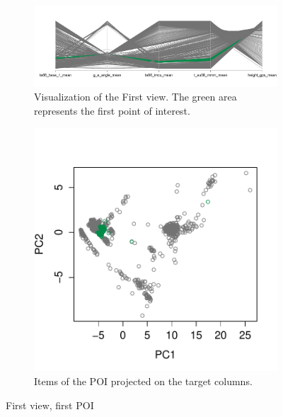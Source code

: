 \begin{figure}[t!]
        \centering
        \begin{subfigure}[b]{0.75\textwidth}
                \includegraphics[width=\textwidth]{images/vibration_group_1}
                \caption{Visualization of the First view. The green area
                represents the first point of interest.}
                \label{fig:vibration_group_1}
        \end{subfigure}%
        \begin{subfigure}[b]{0.25\textwidth}
                \includegraphics[width=\textwidth]{images/vibration_target_1}
                \caption{Items of the POI projected on the target columns.}
                \label{fig:/vibration_target_2}
        \end{subfigure}
        \caption{First view, first POI}\label{fig:vibra-group1}
\end{figure}


